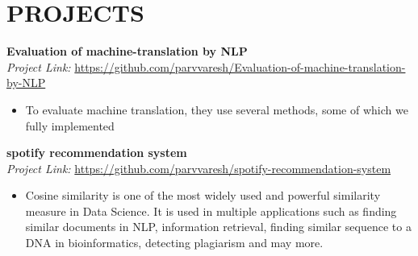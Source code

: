 \documentclass[a4paper,9pt]{extarticle}
\begin{document}
\section*{PROJECTS}

\noindent
\textbf{Evaluation of machine-translation by NLP} \hfill \\ %
\textit{Project Link:} \url{https://github.com/parvvaresh/Evaluation-of-machine-translation-by-NLP} \hfill 
\begin{itemize}
    \item To evaluate machine translation, they use several methods, some of which we fully implemented %
\end{itemize}



\noindent
\textbf{spotify recommendation system} \hfill \\ %
\textit{Project Link:} \url{https://github.com/parvvaresh/spotify-recommendation-system} \hfill 
\begin{itemize}
    \item Cosine similarity is one of the most widely used and powerful similarity measure in Data Science. It is used in multiple applications such as finding similar documents in NLP, information retrieval, finding similar sequence to a DNA in bioinformatics, detecting plagiarism and may more. %
\end{itemize}
\end{document}
